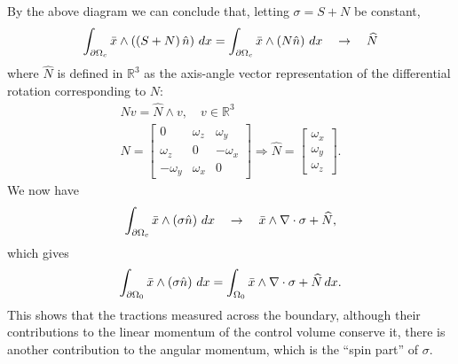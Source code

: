 By the above diagram we can conclude that, letting $\sigma = S + N$ be constant,
\begin{align*}
    \int_{{\partial\Omega}_c} \bar{x} \wedge \left(\left(S + N\right)\hat{n}\right)\,dx
    =
    \int_{{\partial\Omega}_c} \bar{x} \wedge \left(N\hat{n}\right)\,dx
    \quad\rightarrow\quad
    \widehat{N}
\end{align*}
where $\widehat{N}$ is defined in $\mathbb{R}^3$ as the axis-angle vector representation of the differential rotation corresponding to $N$:
\begin{equation}
\begin{split}
    Nv = \widehat{N}\wedge v,\quad v\in\mathbb{R}^3
    \\
    N = \begin{bmatrix}
        0 & \omega_z & \omega_y \\ \omega_z & 0 & -\omega_x  \\ -\omega_y & \omega_x & 0
    \end{bmatrix} \Rightarrow \widehat{N} = \begin{bmatrix} \omega_x \\ \omega_y \\ \omega_z \end{bmatrix}.
\end{split}
\end{equation}
We now have
\begin{equation}
    \int_{{\partial\Omega}_c} \bar{x}\wedge\left(\sigma\hat{n}\right)\,dx \quad\rightarrow\quad
    \bar{x}\wedge \nabla\cdot \sigma + \widehat{N},
\end{equation}
which gives 
\begin{equation}
    \int_{{\partial\Omega_0}} \bar{x} \wedge \left(\sigma\hat{n}\right)\,dx = \int_{\Omega_0} \bar{x}\wedge\nabla\cdot\sigma + \widehat{N}\,dx.
\end{equation}
This shows that the tractions measured across the boundary, although their contributions to the linear momentum of the control volume conserve it,
there is another contribution to the angular momentum, which is the ``spin part'' of $\sigma$.

